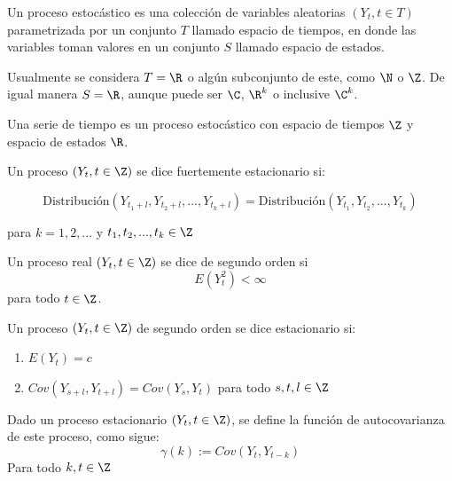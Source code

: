 \documentclass[12pt,oneside]{book}\usepackage[]{graphicx}\usepackage[]{color}
\theoremstyle{definition} %
\begin{document}
\begin{definicion}
Un proceso estocástico es una colección de variables aleatorias $(Y_t , t\in T)$ parametrizada por un conjunto $T$ llamado espacio  de tiempos, en donde las variables toman valores en un conjunto $S$ llamado espacio de estados.
\end{definicion}

Usualmente se considera $T = \R$ o algún subconjunto de este, como $\N$ o $\Z$. De igual manera $S=\R$, aunque puede ser $\C$, $\R^k$ o inclusive $\C^k$.

\begin{definicion}
Una serie de tiempo es un proceso estocástico con espacio de tiempos $\Z$ y espacio de estados $\R$.
\end{definicion}




\begin{definicion}
Un proceso $(Y_t, t\in \Z)$ se dice fuertemente estacionario si:

$$ \text{Distribución}(Y_{t_1+l},Y_{t_2+l},...,Y_{t_k+l}) =  \text{Distribución}(Y_{t_1},Y_{t_2},...,Y_{t_k}) $$

para $k=1,2,...$ y $t_1, t_2,..., t_k \in \Z$
\end{definicion}

\begin{definicion}
Un proceso real $(Y_t, t \in \Z)$ se dice de segundo orden si 
$$E(Y_t^2)<\infty$$ 
para todo $t\in\Z$.
\end{definicion}

\begin{definicion}
Un proceso $(Y_t, t\in \Z)$ de segundo orden se dice estacionario si:
\begin{enumerate}
\item $E(Y_t)=c$
\item $Cov(Y_{s+l}, Y_{t+l})=Cov(Y_{s}, Y_{t})$ para todo $s,t,l\in \Z$
\end{enumerate}

\end{definicion}



\begin{definicion}
Dado un proceso estacionario $(Y_t, t \in \Z)$, se define la función de autocovarianza de este proceso, como sigue:
$$\gamma(k):=Cov(Y_t, Y_{t-k})$$
Para todo $k,t\in\Z$
\end{definicion}
\end{document}
